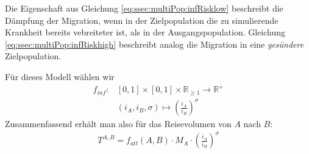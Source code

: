 Die Eigenschaft aus Gleichung \ref{eq:ssec:multiPop:infRisklow} beschreibt die Dämpfung der Migration, wenn in der Zielpopulation die zu simulierende Krankheit bereits vebreiteter ist, als in der Ausgangspopulation. Gleichung \ref{eq:ssec:multiPop:infRiskhigh} beschreibt analog die Migration in eine \emph{gesündere} Zielpopulation.

Für dieses Modell wählen wir
\begin{align}
	f_{inf} :& [0,1]\times [0,1] \times \mathbb{R}_{\geq 1} \rightarrow  \mathbb{R}^+\\
			 & (i_A,i_B,\sigma)\longmapsto								 \left( \frac{i_A}{i_B}\right)^\sigma\nonumber
\end{align}
Zusammenfassend erhält man also für das Reisevolumen von $A$ nach $B$:
\begin{align}
	T^{A,B} = f_{att}(A,B)\cdot M_A \cdot \left(\frac{i_A}{i_B}\right)^\sigma
\end{align}